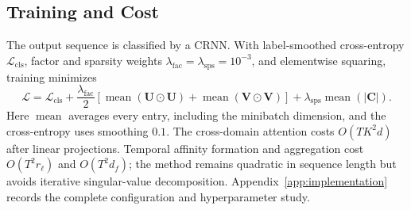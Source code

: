 \subsection{Training and Cost}
The output sequence is classified by a CRNN. With label-smoothed cross-entropy $\mathcal L_{\mathrm{cls}}$, factor and sparsity weights $\lambda_{\mathrm{fac}}=\lambda_{\mathrm{sps}}=10^{-3}$, and elementwise squaring, training minimizes
\begin{equation}
\mathcal L=\mathcal L_{\mathrm{cls}}
+\frac{\lambda_{\mathrm{fac}}}{2}
\left[\operatorname{mean}(\mathbf U\odot\mathbf U)+\operatorname{mean}(\mathbf V\odot\mathbf V)\right]
+\lambda_{\mathrm{sps}}\operatorname{mean}(|\mathbf C|).
\label{eq:objective}
\end{equation}
Here $\operatorname{mean}$ averages every entry, including the minibatch dimension, and the cross-entropy uses smoothing $0.1$. The cross-domain attention costs $O(TK^2d)$ after linear projections. Temporal affinity formation and aggregation cost $O(T^2r_\ell)$ and $O(T^2d_f)$; the method remains quadratic in sequence length but avoids iterative singular-value decomposition. Appendix~\ref{app:implementation} records the complete configuration and hyperparameter study.
